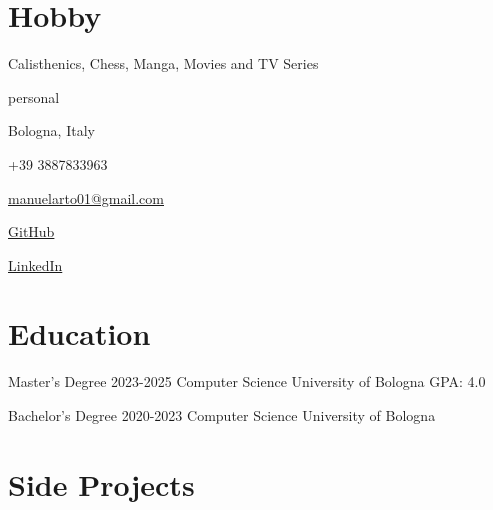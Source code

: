 \documentclass{tccv}
\begin{document}
\section{Hobby}

Calisthenics, Chess, Manga, Movies and TV Series


\newpage


\begin{keyvaluelist}{personal}
    \item[\faHome] Bologna, Italy
    \item[\faPhone] +39 3887833963
    \item[\faEnvelope] \href{mailto:manuelarto01@gmail.com}{manuelarto01@gmail.com}
    \item[\faGithub] \href{https://github.com/manuelarto}{GitHub}
    \item[\faLinkedin] \href{https://www.linkedin.com/in/manuel-arto-696012203/}{LinkedIn}
\end{keyvaluelist}


\section{Education}

\begin{yearlist}

\item[Master's Degree]{2023-2025}
     {Computer Science}
     {University of Bologna \newline GPA: 4.0}

\item[Bachelor's Degree]{2020-2023}
    {Computer Science}
    {University of Bologna}

\end{yearlist}


\section{Side Projects}
\end{document}
